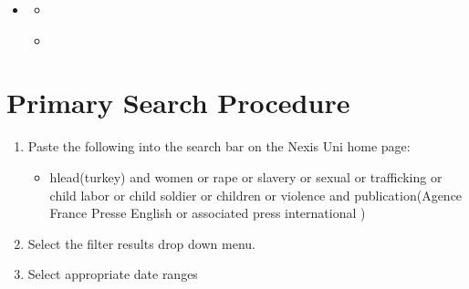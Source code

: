 \documentclass[letterpaper,10pt,english]{sphinxmanual}
\begin{document}
\begin{sphinxShadowBox}
\begin{itemize}
\item {} 
\sphinxAtStartPar
{}\label{\detokenize{event_query_procedure:id2}}{\hyperref[\detokenize{event_query_procedure:event-query-procedure}]{}}
\begin{itemize}
\item {} 
\sphinxAtStartPar
{}\label{\detokenize{event_query_procedure:id3}}{\hyperref[\detokenize{event_query_procedure:primary-search-procedure}]{}}

\item {} 
\sphinxAtStartPar
{}\label{\detokenize{event_query_procedure:id4}}{\hyperref[\detokenize{event_query_procedure:query-result-sorting-procedure}]{}}

\end{itemize}

\end{itemize}
\end{sphinxShadowBox}


\section{Primary Search Procedure}
\label{\detokenize{event_query_procedure:primary-search-procedure}}\begin{enumerate}
%
\item {} 
\sphinxAtStartPar
Paste the following into the search bar on the Nexis Uni home page:
\begin{itemize}
\item {} 
\sphinxAtStartPar
hlead(turkey) and women or rape or slavery or sexual or trafficking or child labor or child soldier or children or violence and publication(Agence France Presse \sphinxhyphen{} English or associated press international )

\end{itemize}

\item {} 
\sphinxAtStartPar
Select the filter results drop down menu.

\item {} 
\sphinxAtStartPar
Select appropriate date ranges

\end{enumerate}
\end{document}

